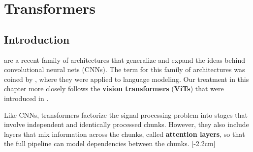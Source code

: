 \chapter{Transformers}\label{chapter:transformers}


\section{Introduction}

 are a recent family of architectures that generalize and expand the ideas behind convolutional neural nets (CNNs). The term for this family of architectures was coined by \cite{vaswani2017attention}, where they were applied to language modeling. Our treatment in this chapter more closely follows the \textbf{vision transformers} (\textbf{ViTs}) that were introduced in \cite{dosovitskiy2020vit}.%

Like CNNs, transformers factorize the signal processing problem into stages that involve independent and identically processed chunks. However, they also include layers that mix information across the chunks, called \textbf{attention layers}, so that the full pipeline can model dependencies between the chunks. %
[-2.2cm]



